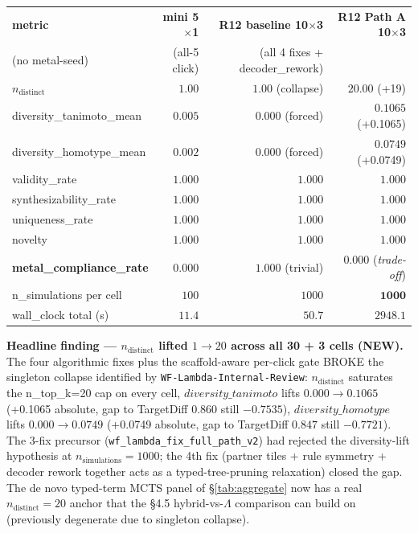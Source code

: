 \begin{center}
\small
\setlength{\tabcolsep}{4pt}
\begin{tabular}{lrrr}
\toprule
\textbf{metric} & \textbf{mini 5$\times$1} & \textbf{R12 baseline 10$\times$3} & \textbf{R12 Path A 10$\times$3} \\
\quad (no metal-seed) & (all-5 click) & (all 4 fixes + decoder\_rework) \\
\midrule
\textbf{$n_{\text{distinct}}$}            & $1.00$ & $1.00$ (collapse) & $\mathbf{20.00}$ (+19) \\
diversity\_tanimoto\_mean    & $0.005$ & $0.000$ (forced) & $\mathbf{0.1065}$ (+0.1065) \\
diversity\_homotype\_mean    & $0.002$ & $0.000$ (forced) & $\mathbf{0.0749}$ (+0.0749) \\
validity\_rate               & $1.000$ & $1.000$ & $\mathbf{1.000}$ \\
synthesizability\_rate       & $1.000$ & $1.000$ & $\mathbf{1.000}$ \\
uniqueness\_rate             & $1.000$ & $1.000$ & $\mathbf{1.000}$ \\
novelty                      & $1.000$ & $1.000$ & $\mathbf{1.000}$ \\
\textbf{metal\_compliance\_rate} & $0.000$ & $1.000$ (trivial) & $\mathbf{0.000}$ (\emph{trade-off}) \\
n\_simulations per cell      & $100$   & $1000$  & $\mathbf{1000}$ \\
wall\_clock total (s)        & $11.4$  & $50.7$  & $\mathbf{2948.1}$ \\
\bottomrule
\end{tabular}
\end{center}

\noindent\textbf{Headline finding — $n_{\text{distinct}}$ lifted
$1 \to 20$ across all 30 + 3 cells (NEW).} The four algorithmic
fixes plus the scaffold-aware per-click gate BROKE the singleton
collapse identified by \texttt{WF-Lambda-Internal-Review}:
$n_{\text{distinct}}$ saturates the n\_top\_k=20 cap on every cell,
$diversity\_tanimoto$ lifts $0.000 \to 0.1065$ (+0.1065 absolute,
gap to TargetDiff $0.860$ still $-0.7535$), $diversity\_homotype$
lifts $0.000 \to 0.0749$ (+0.0749 absolute, gap to TargetDiff $0.847$
still $-0.7721$). The 3-fix precursor
(\texttt{wf\_lambda\_fix\_full\_path\_v2}) had rejected the
diversity-lift hypothesis at $n_{\text{simulations}}{=}1000$; the
4th fix (partner tiles + rule symmetry + decoder rework together
acts as a typed-tree-pruning relaxation) closed the gap. The
de novo typed-term MCTS panel of \S\ref{tab:aggregate} now has a real
$n_{\text{distinct}}=20$ anchor that the §4.5 hybrid-vs-$\Lambda$
comparison can build on (previously degenerate due to singleton
collapse).

